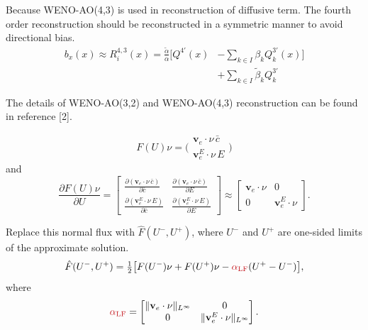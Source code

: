 \documentclass[usenames,dvipsnames,letterpaper,landscape,final]{slides}
\renewcommand{\d}{\partial}
\def\twoVec(#1,#2){\bigg(\begin{matrix}#1\\#2\end{matrix}\bigg)}
\def\d{\partial}
\def\v{\mathbf{v}}
\begin{document}
\begin{myslideNoFooter}
\bigskip
\parbox{0.6\textwidth}{\raggedright
Because WENO-AO(4,3) is used in reconstruction of diffusive term. The fourth order reconstruction should 
be reconstructed in a symmetric manner to avoid directional bias.
\begin{equation*}
\begin{aligned}
 b_x(x) \approx R_i^{4,3}(x) = \frac{\tilde \alpha}{\alpha}[Q^{4'}(x) &- \sum_{k\in I}\beta_k Q_k^{3'}(x)] \\
                                                               &+ \sum_{k\in I}\tilde \beta_k Q_k^{3'}
 \end{aligned}
\end{equation*}
}\parbox{0.4\textwidth}{\setlength\unitlength{4.5pt}

}

\bigskip
\bigskip
The details of WENO-AO(3,2) and WENO-AO(4,3) reconstruction can be found in reference [2].
\end{myslideNoFooter}

\begin{myslideNoFooter}
\begin{equation*}
F(U)\nu = \twoVec({\v_e\cdot\nu\,\bar c},{\v_e^E\cdot\nu\,E})
\end{equation*}
and
\begin{equation*}
    \frac{\d F(U)\nu}{\d U} = \left[\begin{matrix}
    \frac{\d(\v_e\cdot\nu\,\bar c)}{\d\bar c}
        &\frac{\d(\v_e\cdot\nu\,\bar c)}{\d E}\\[4pt]
    \frac{\d(\v_e^E\cdot\nu\,E)}{\d\bar c}
        &\frac{\d(\v_e^E\cdot\nu\,E)}{\d E}
    \end{matrix}\right]
    \approx
    \left[\begin{matrix}
    \v_e\cdot\nu&0\\
    0&\v_e^E\cdot\nu
    \end{matrix}\right].
\end{equation*}

\newline
Replace this normal flux with $\hat F(U^-,U^+)$, where $U^-$ and $U^+$ are one-sided limits of the approximate solution.
\begin{equation}
    \hat F(U^-,U^+)
    = \tfrac12\big[F(U^-)\nu + F(U^+)\nu
    - \Maroon{\alpha_{\textrm{LF}}}(U^+ - U^-)\big],
\end{equation}
where
\begin{equation}
    \Maroon{\alpha_{\textrm{LF}}} =  \left[\begin{matrix}
    \|\v_e\cdot\nu\|_{L^\infty}&0\\
    0&\|\v_e^E\cdot\nu\|_{L^\infty}
    \end{matrix}\right].
\end{equation}

\end{myslideNoFooter}
\end{document}
